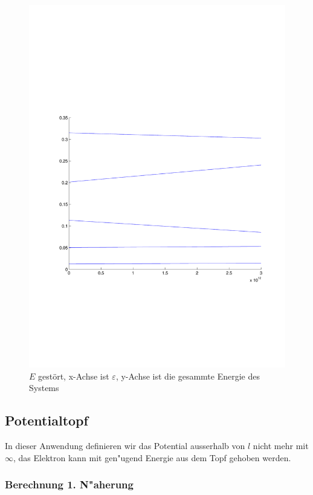 \begin{refsection}
\begin{figure}
 \centering
 \includegraphics[width=12cm,clip=true,trim=2cm 7cm 1cm 8cm]{efeld/Energie_gestoert.pdf}
 \caption{$E$ gest\"ort, x-Achse ist $\varepsilon$, y-Achse ist die gesammte Energie des Systems}
 \label{abb:efeld_E_gestoert}
\end{figure}











\subsection{Potentialtopf}

In dieser Anwendung definieren wir das Potential ausserhalb von $l$ nicht mehr mit $\infty$, das Elektron kann mit gen"ugend Energie aus dem Topf gehoben werden.

\subsubsection{Berechnung 1. N"aherung}


\end{refsection}
